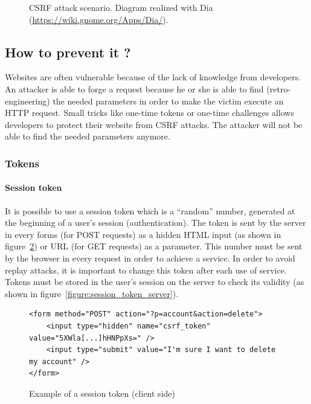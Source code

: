\documentclass[a4paper,11pt,openany]{report}
\begin{document}
\begin{figure}[h!t]
  \begin{center}
    \caption{
      CSRF attack scenario. Diagram realized with Dia (\url{https://wiki.gnome.org/Apps/Dia/}).
    }
    \label{figure:csrf_scenario}
  \end{center}
\end{figure}
  
  \subsection{How to prevent it ?}
  Websites are often vulnerable because of the lack of knowledge from developers. An attacker is able 
  to forge a request because he or she is able to find (retro-engineering) the needed parameters in 
  order to make the victim execute an HTTP request. Small tricks like one-time tokens or one-time 
  challenges allows developers to protect their website from CSRF attacks. The attacker will not be able 
  to find the needed parameters anymore.
  
  \subsubsection{Tokens}
  
  \paragraph{Session token}
  It is possible to use a session token which is a ``random'' number, generated at the beginning 
  of a user's session (authentication). The token is sent by the server in every forms (for POST 
  requests) as a hidden HTML input (as shown in figure~\ref{figure:session_token_client}) or URL 
  (for GET requests) as a parameter. This number must be sent by the browser in every request in 
  order to achieve a service. In order to avoid replay attacks, it is important to change this token 
  after each use of service. Tokens must be stored in the user's session on the server to check its 
  validity (as shown in figure~\ref{figure:session_token_server}).
  
  \begin{figure}[h!t]
  \begin{verbatim}
<form method="POST" action="?p=account&action=delete">
    <input type="hidden" name="csrf_token" value="5XWla[...]hHNPpXs=" />
    <input type="submit" value="I'm sure I want to delete my account" />
</form>
  \end{verbatim}
  \caption{Example of a session token (client side)}
  \label{figure:session_token_client}
  \end{figure}
  
\end{document}
